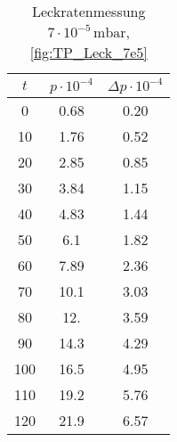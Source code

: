 \begin{table}[H]
    \centering
    \caption{Leckratenmessung $7 \cdot 10^{-5} \, \si{\milli\bar}$, \ref{fig:TP_Leck_7e5}}
    \label{tab:TP_Leck_7e5}
    \begin{tabular}{c c c}
        \toprule
        {$t$} & {$p \cdot 10^{-4}$} & {$\Delta p \cdot 10^{-4}$} \\
        \midrule
        0  &  0.68 & 0.20\\
        10 &  1.76 & 0.52\\
        20 &  2.85 & 0.85\\
        30 &  3.84 & 1.15\\
        40 &  4.83 & 1.44\\
        50 &  6.1  & 1.82\\
        60 &  7.89 & 2.36\\
        70 &  10.1 & 3.03\\
        80 &  12.  & 3.59\\
        90 &  14.3 & 4.29\\
        100 & 16.5 & 4.95\\
        110 & 19.2 & 5.76\\
        120 & 21.9 & 6.57\\
        \bottomrule
    \end{tabular}
\end{table}

